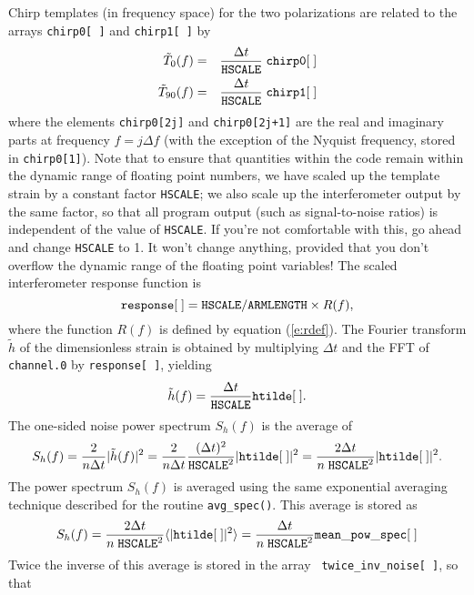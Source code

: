 Chirp templates (in frequency space) for the two polarizations are
related to the arrays \hbox{\tt chirp0[ ]} and \hbox{\tt chirp1[ ]} by
\begin{eqnarray}
\tilde T_{0}(f) &=& {\Delta t  \over {\tt HSCALE}} \;{\tt chirp0[\;]}\\
\tilde T_{90}(f) &=& {\Delta t \over {\tt HSCALE}} \; {\tt chirp1[\;]}
\end{eqnarray}
where the elements {\tt chirp0[2j]} and {\tt chirp0[2j+1]} are the real
and imaginary parts at frequency $f= j \Delta f$ (with the exception of
the Nyquist frequency, stored in {\tt chirp0[1]}).  Note that to ensure
that quantities within the code remain within the dynamic range of
floating point numbers, we have scaled up the template strain by a
constant factor {\tt HSCALE}; we also scale up the interferometer
output by the same factor, so that all program output (such as
signal-to-noise ratios) is independent of the value of {\tt HSCALE}.
If you're not comfortable with this, go ahead and change {\tt HSCALE} to 1.
It won't change anything, provided that you don't overflow the dynamic
range of the floating point variables!
The scaled interferometer response function is
\begin{equation}
{\tt response[\;]} = {\tt HSCALE}/{\tt ARMLENGTH} \times R(f),
\end{equation}
where the function $R(f)$ is defined by equation (\ref{e:rdef}).
The Fourier transform $\tilde h$ of the dimensionless strain is
obtained by multiplying $\Delta t$ and the FFT of {\tt channel.0} by
{\tt response[ ]}, yielding
\begin{equation}
\tilde h(f) = {\Delta t \over {\tt HSCALE}} {\tt htilde[\;]}.
\end{equation}
The one-sided noise power spectrum $S_h(f)$ is the average of 
\begin{equation}
S_h(f) = {2 \over n \Delta t} | \tilde h(f) |^2 =
{2 \over n \Delta t} {(\Delta t)^2 \over {\tt HSCALE}^2} |{\tt htilde[\;]}|^2
= {2 \Delta t \over n \; {\tt HSCALE}^2} |{\tt htilde[\;]}|^2.
\end{equation}
The power spectrum $S_h(f)$ is averaged using the same exponential
averaging technique described for the routine {\tt avg\_spec()}.  This
average is stored as
\begin{equation}
{  S_h(f)} = {2 \Delta t \over n \; {\tt HSCALE}^2 }
\langle |{\tt htilde[\;]}|^{2} \rangle 
= { \Delta t \over n \; {\tt HSCALE}^2 } {\tt mean\_pow\_spec[\;]}
\end{equation}
Twice the inverse of this average is stored in the array {\tt
twice\_inv\_noise[ ]}, so that

